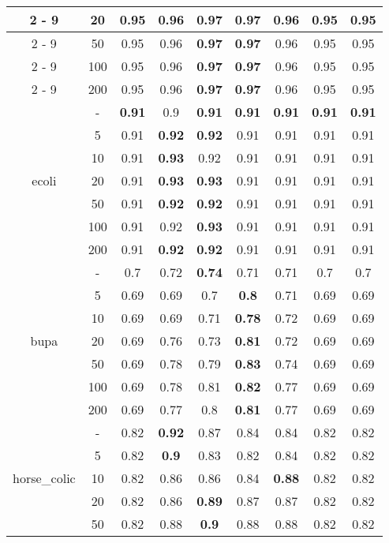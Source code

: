 \documentclass{article}%
\begin{document}
\begin{longtable}{c|c|ccccccc}
\cline{2%
-%
9}%
&20&0.95&0.96&\textbf{0.97}&\textbf{0.97}&0.96&0.95&0.95\\%
\cline{2%
-%
9}%
&50&0.95&0.96&\textbf{0.97}&\textbf{0.97}&0.96&0.95&0.95\\%
\cline{2%
-%
9}%
&100&0.95&0.96&\textbf{0.97}&\textbf{0.97}&0.96&0.95&0.95\\%
\cline{2%
-%
9}%
&200&0.95&0.96&\textbf{0.97}&\textbf{0.97}&0.96&0.95&0.95\\%
\hline%
\multirow{7}{*}{ecoli}&{-}&\textbf{0.91}&0.9&\textbf{0.91}&\textbf{0.91}&\textbf{0.91}&\textbf{0.91}&\textbf{0.91}\\%
\cline{2%
-%
9}%
&5&0.91&\textbf{0.92}&\textbf{0.92}&0.91&0.91&0.91&0.91\\%
\cline{2%
-%
9}%
&10&0.91&\textbf{0.93}&0.92&0.91&0.91&0.91&0.91\\%
\cline{2%
-%
9}%
&20&0.91&\textbf{0.93}&\textbf{0.93}&0.91&0.91&0.91&0.91\\%
\cline{2%
-%
9}%
&50&0.91&\textbf{0.92}&\textbf{0.92}&0.91&0.91&0.91&0.91\\%
\cline{2%
-%
9}%
&100&0.91&0.92&\textbf{0.93}&0.91&0.91&0.91&0.91\\%
\cline{2%
-%
9}%
&200&0.91&\textbf{0.92}&\textbf{0.92}&0.91&0.91&0.91&0.91\\%
\hline%
\multirow{7}{*}{bupa}&{-}&0.7&0.72&\textbf{0.74}&0.71&0.71&0.7&0.7\\%
\cline{2%
-%
9}%
&5&0.69&0.69&0.7&\textbf{0.8}&0.71&0.69&0.69\\%
\cline{2%
-%
9}%
&10&0.69&0.69&0.71&\textbf{0.78}&0.72&0.69&0.69\\%
\cline{2%
-%
9}%
&20&0.69&0.76&0.73&\textbf{0.81}&0.72&0.69&0.69\\%
\cline{2%
-%
9}%
&50&0.69&0.78&0.79&\textbf{0.83}&0.74&0.69&0.69\\%
\cline{2%
-%
9}%
&100&0.69&0.78&0.81&\textbf{0.82}&0.77&0.69&0.69\\%
\cline{2%
-%
9}%
&200&0.69&0.77&0.8&\textbf{0.81}&0.77&0.69&0.69\\%
\hline%
\multirow{7}{*}{horse\_colic}&{-}&0.82&\textbf{0.92}&0.87&0.84&0.84&0.82&0.82\\%
\cline{2%
-%
9}%
&5&0.82&\textbf{0.9}&0.83&0.82&0.84&0.82&0.82\\%
\cline{2%
-%
9}%
&10&0.82&0.86&0.86&0.84&\textbf{0.88}&0.82&0.82\\%
\cline{2%
-%
9}%
&20&0.82&0.86&\textbf{0.89}&0.87&0.87&0.82&0.82\\%
\cline{2%
-%
9}%
&50&0.82&0.88&\textbf{0.9}&0.88&0.88&0.82&0.82\\%

\end{longtable}
\end{document}
